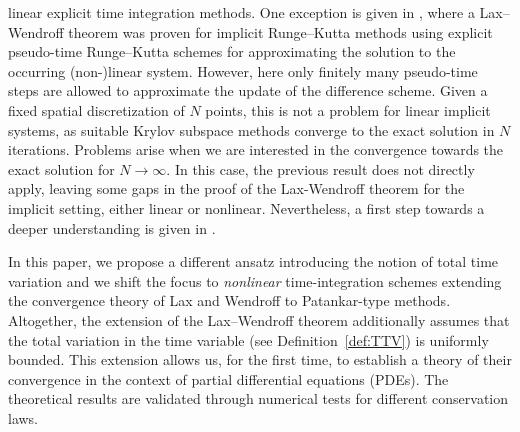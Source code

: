 \documentclass[final,11pt, times, linenumber, nopreprintline]{elsarticle}
\newcommand{\DT}[1]{{\color{purple}#1}}
\begin{document}
linear explicit time integration methods.
One exception is given in \cite{birken_conservation_2022, LB24}, where a Lax--Wendroff theorem was proven for implicit Runge--Kutta methods using explicit pseudo-time Runge--Kutta schemes for approximating the solution to the occurring (non-)linear system. 
However, here only finitely many pseudo-time steps are allowed to approximate the update of the difference scheme. 
Given a fixed spatial discretization of $N$ points, this is not a problem for linear implicit systems, as suitable Krylov subspace methods converge to the exact solution in $N$ iterations.
Problems arise when we are interested in the convergence towards the exact solution for $N\to \infty$.
In this case, the previous result does not directly apply, leaving some gaps in the proof of the Lax-Wendroff theorem for the implicit setting, either linear or nonlinear.
Nevertheless, a first step towards a deeper understanding is given in \cite{LB23_Krylov_consistency}. %


In this paper, we propose a different ansatz introducing the notion of total time variation and we shift the focus to \textit{nonlinear} time-integration schemes extending the convergence theory of Lax and Wendroff to Patankar-type methods. Altogether, the extension of the Lax--Wendroff theorem additionally assumes that the total variation in the time variable (see Definition~\ref{def:TTV}) is uniformly bounded.
This extension allows us, for the first time, to establish a theory of their convergence in the context of partial differential equations (PDEs). The theoretical results are validated through numerical tests for different conservation laws.
\end{document}
